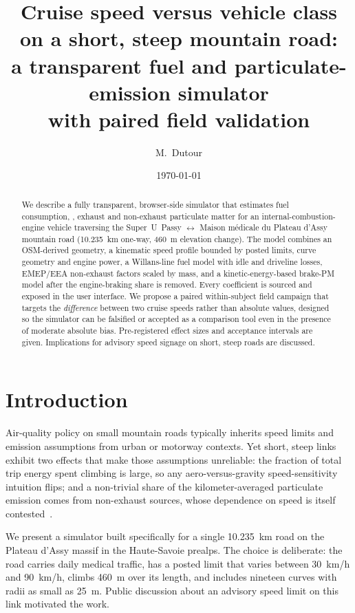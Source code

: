 \documentclass[11pt,a4paper]{article}
\title{Cruise speed versus vehicle class on a short, steep mountain road:\\
a transparent fuel and particulate-emission simulator\\
with paired field validation}
\author[1]{M.~Dutour}
\affil[1]{Independent --- \texttt{simulateur-vitesse-pollution-montagne}, Plateau d'Assy, France}
\date{\today}
\begin{document}
\maketitle

\begin{abstract}
We describe a fully transparent, browser-side simulator that estimates
fuel consumption, , exhaust and non-exhaust particulate matter
for an internal-combustion-engine vehicle traversing the Super~U~Passy
$\leftrightarrow$ Maison m\'edicale du Plateau d'Assy mountain road
(\SI{10.235}{km} one-way, \SI{460}{m} elevation change). The model
combines an OSM-derived geometry, a kinematic speed profile bounded by
posted limits, curve geometry and engine power, a Willans-line fuel
model with idle and driveline losses, EMEP/EEA non-exhaust factors
scaled by mass, and a kinetic-energy-based brake-PM model after the
engine-braking share is removed. Every coefficient is sourced and
exposed in the user interface. We propose a paired within-subject
field campaign that targets the \emph{difference} between two cruise
speeds rather than absolute values, designed so the simulator can be
falsified or accepted as a comparison tool even in the presence of
moderate absolute bias. Pre-registered effect sizes and acceptance
intervals are given. Implications for advisory speed signage on short,
steep roads are discussed.
\end{abstract}

\section{Introduction}

Air-quality policy on small mountain roads typically inherits speed
limits and emission assumptions from urban or motorway contexts. Yet
short, steep links exhibit two effects that make those assumptions
unreliable: the fraction of total trip energy spent climbing is large,
so any aero-versus-gravity speed-sensitivity intuition flips; and a
non-trivial share of the kilometer-averaged particulate emission
comes from non-exhaust sources, whose dependence on speed is itself
contested~\cite{beddows2021,emep2023ldv}.

We present a simulator built specifically for a single
\SI{10.235}{km} road on the Plateau d'Assy massif in the Haute-Savoie
prealps. The choice is deliberate: the road carries daily medical
traffic, has a posted limit that varies between \SI{30}{km/h} and
\SI{90}{km/h}, climbs \SI{460}{m} over its length, and includes
nineteen curves with radii as small as \SI{25}{m}. Public discussion
about an advisory speed limit on this link motivated the work.
\end{document}

